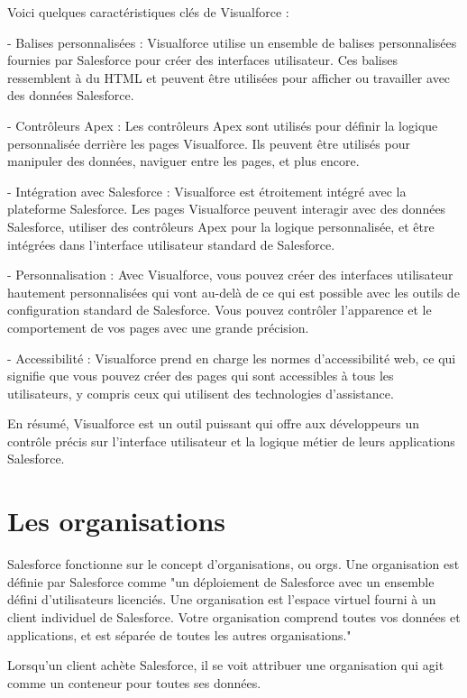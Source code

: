 \documentclass[12pt,oneside,noprintercorrection]{iut}
\begin{document}
Voici quelques caractéristiques clés de Visualforce :

- Balises personnalisées : Visualforce utilise un ensemble de balises personnalisées fournies par Salesforce pour créer des interfaces utilisateur. Ces balises ressemblent à du HTML et peuvent être utilisées pour afficher ou travailler avec des données Salesforce.

- Contrôleurs Apex : Les contrôleurs Apex sont utilisés pour définir la logique personnalisée derrière les pages Visualforce. Ils peuvent être utilisés pour manipuler des données, naviguer entre les pages, et plus encore.

- Intégration avec Salesforce : Visualforce est étroitement intégré avec la plateforme Salesforce. Les pages Visualforce peuvent interagir avec des données Salesforce, utiliser des contrôleurs Apex pour la logique personnalisée, et être intégrées dans l'interface utilisateur standard de Salesforce.

- Personnalisation : Avec Visualforce, vous pouvez créer des interfaces utilisateur hautement personnalisées qui vont au-delà de ce qui est possible avec les outils de configuration standard de Salesforce. Vous pouvez contrôler l'apparence et le comportement de vos pages avec une grande précision.

- Accessibilité : Visualforce prend en charge les normes d'accessibilité web, ce qui signifie que vous pouvez créer des pages qui sont accessibles à tous les utilisateurs, y compris ceux qui utilisent des technologies d'assistance.

En résumé, Visualforce est un outil puissant qui offre aux développeurs un contrôle précis sur l'interface utilisateur et la logique métier de leurs applications Salesforce.

\clearpage

\section{Les organisations \slf{}}
Salesforce fonctionne sur le concept d'organisations, ou orgs. Une organisation est définie par Salesforce comme "un déploiement de Salesforce avec un ensemble défini d'utilisateurs licenciés. Une organisation est l'espace virtuel fourni à un client individuel de Salesforce. Votre organisation comprend toutes vos données et applications, et est séparée de toutes les autres organisations."

Lorsqu'un client achète Salesforce, il se voit attribuer une organisation qui agit comme un conteneur pour toutes ses données.
\end{document}
